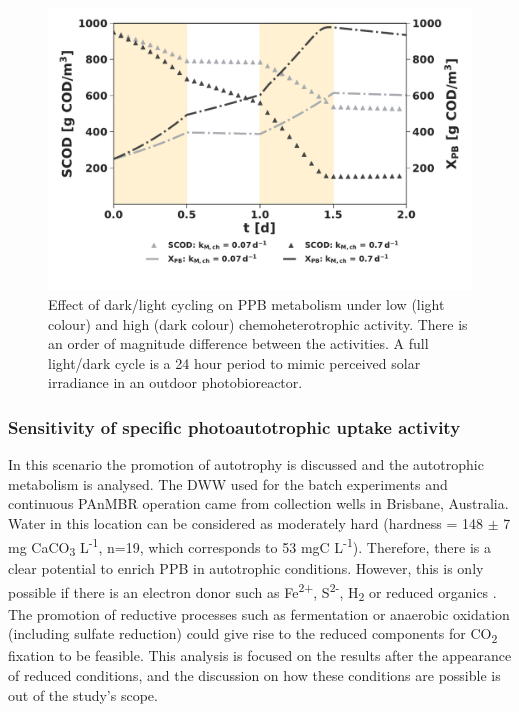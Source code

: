 \begin{figure}[tp]
    \centering
    \includegraphics[width=1\linewidth]{./Chap2/simulations/ch2_kmch.pdf}
    \caption{Effect of dark/light cycling on PPB metabolism under low (light colour) and high (dark colour) chemoheterotrophic activity. There is an order of magnitude difference between the activities. A full light/dark cycle is a 24 hour period to mimic perceived solar irradiance in an outdoor photobioreactor.}
    \label{fig:ch2_kmch}
\end{figure}

\subsubsection{Sensitivity of specific photoautotrophic uptake activity}
In this scenario the promotion of autotrophy is discussed and the autotrophic metabolism is analysed. The DWW used for the batch experiments and continuous PAnMBR operation came from collection wells in Brisbane, Australia. Water in this location can be considered as moderately hard (hardness = 148 $\pm$ 7 mg CaCO\textsubscript{3} L\textsuperscript{-1}, n=19, which corresponds to 53 mgC L\textsuperscript{-1}). Therefore, there is a clear potential to enrich PPB in autotrophic conditions. However, this is only possible if there is an electron donor such as Fe\textsuperscript{2+}, S\textsuperscript{2-}, H\textsubscript{2} or reduced organics \cite{McKinlay2011}. The promotion of reductive processes such as fermentation or anaerobic oxidation (including sulfate reduction) could give rise to the reduced components for CO\textsubscript{2} fixation to be feasible. This analysis is focused on the results after the appearance of reduced conditions, and the discussion on how these conditions are possible is out of the study's scope. 


